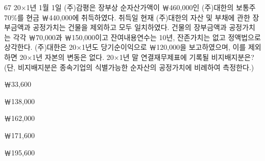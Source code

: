 \begin{question}{67}
20×1년 1월 1일 (주)감평은 장부상 순자산가액이 ￦460,000인 (주)대한의 보통주 70\%를 현금 ￦440,000에 취득하였다. 취득일 현재 (주)대한의 자산 및 부채에 관한 장부금액과 공정가치는 건물을 제외하고 모두 일치하였다. 건물의 장부금액과 공정가치는 각각 ￦70,000과 ￦150,000이고 잔여내용연수는 10년, 잔존가치는 없고 정액법으로 상각한다. (주)대한은 20×1년도 당기순이익으로 ￦120,000을 보고하였으며, 이를 제외하면 20×1년 자본의 변동은 없다. 20×1년 말 연결재무제표에 기록될 비지배지분은? (단, 비지배지분은 종속기업의 식별가능한 순자산의 공정가치에 비례하여 측정한다.)
\begin{choices}
  \item ￦33,600
  \item ￦138,000
  \item ￦162,000
  \item ￦171,600
  \item ￦195,600
\end{choices}
\end{question}
